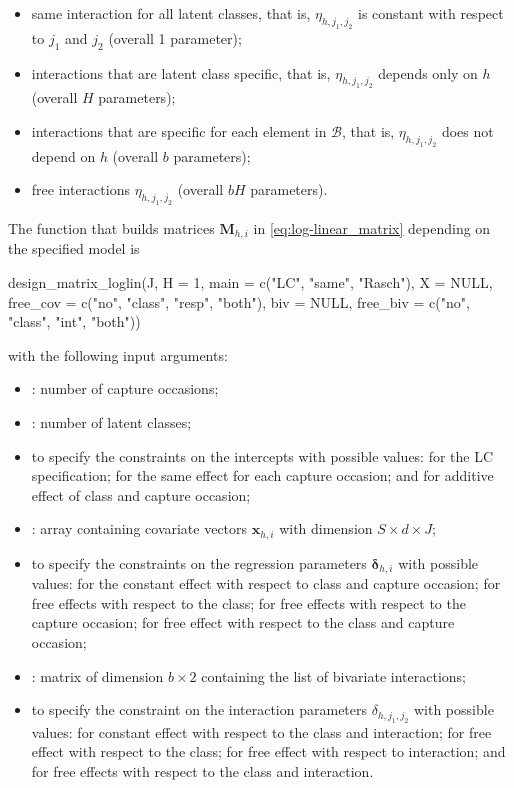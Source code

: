 \begin{enumerate}
%
\begin{itemize}
%
\item same interaction for all latent classes, that is, $\eta_{h,j_1,j_2}$ is constant with respect to $j_1$ and $j_2$ (overall 1 parameter);
%
\item interactions that are latent class specific, that is, $\eta_{h,j_1,j_2}$ depends only on $h$ (overall $H$ parameters);
%
\item interactions that are specific for each element in $\mathcal{B}$, that is, $\eta_{h,j_1,j_2}$ does not depend on $h$ (overall $b$ parameters);
%
\item free interactions $\eta_{h,j_1,j_2}$ (overall $bH$ parameters).
%
\end{itemize}
%
\end{enumerate}

The function that builds matrices $\bm{M}_{h,i}$ in \eqref{eq:log-linear_matrix} depending on the specified model is
\begin{example*}
design_matrix_loglin(J, H = 1, main = c("LC", "same", "Rasch"), X = NULL,
                     free_cov = c("no", "class", "resp", "both"),
                     biv = NULL, free_biv = c("no", "class", "int", "both"))
\end{example*}
%
with the following input arguments:
%
\begin{itemize}
%
\item {}: number of capture occasions;
%
\item {}: number of latent classes;
%
\item {} to specify the constraints on the intercepts with possible values:  for the LC specification;  for the same effect for each capture occasion; and  for additive effect of class and capture occasion;
%
\item {}: array containing covariate vectors $\bm{x}_{h,i}$ with dimension $S\times d \times J$;
%
\item {} to specify the constraints on the regression parameters $\bm{\delta}_{h,i}$ with possible values:  for the constant effect with respect to class and capture occasion;  for free effects with respect to the class;  for free effects with respect to the capture occasion;  for free effect with respect to the class and capture occasion;
%
\item {}: matrix of dimension $b\times 2$ containing the list of bivariate interactions;
%
\item {} to specify the constraint on the interaction parameters $\delta_{h,j_1,j_2}$ with possible values:  for constant effect with respect to the class and interaction;  for free effect with respect to the class;  for free effect with respect to interaction; and  for free effects with respect to the class and interaction.
%
\end{itemize}

